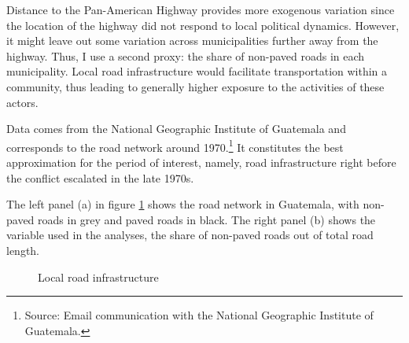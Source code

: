 \documentclass[12pt, notitlepage]{article}
\begin{document}
Distance to the Pan-American Highway provides more exogenous variation since the location of the highway did not respond to local political dynamics.
However, it might leave out some variation across municipalities further away from the highway.
Thus, I use a second proxy: the share of non-paved roads in each municipality.
Local road infrastructure would facilitate transportation within a community, thus leading to generally higher exposure to the activities of these actors.

Data comes from the National Geographic Institute of Guatemala \citep{Segeplan:2019aa} and corresponds to the road network around 1970.\footnote{Source: Email communication with the National Geographic Institute of Guatemala.}
It constitutes the best approximation for the period of interest, namely, road infrastructure right before the conflict escalated in the late 1970s.

The left panel (a) in figure \ref{fig:map_roads} shows the road network in Guatemala, with non-paved roads in grey and paved roads in black.
The right panel (b) shows the variable used in the analyses, the share of non-paved roads out of total road length.

\begin{figure}[!ht]
    \centering

    \begin{minipage}{1\textwidth}
      \centering
      \hspace{25pt}
    \end{minipage}

    \caption{Local road infrastructure} \label{fig:map_roads}

\end{figure}
\end{document}
